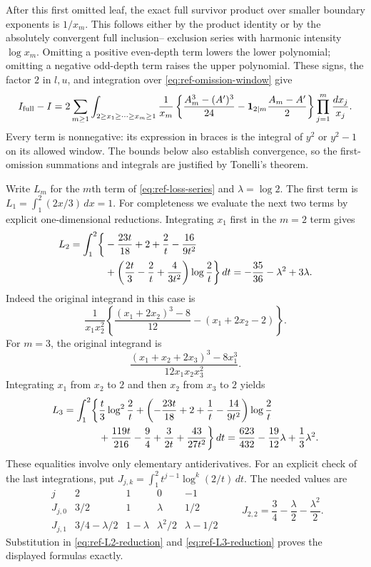 After this first omitted leaf, the exact full survivor product over
smaller boundary exponents is $1/x_m$.  This follows either by the
product identity or by the absolutely convergent full inclusion--
exclusion series with harmonic intensity $\log x_m$.  Omitting a
positive even-depth term lowers the lower polynomial; omitting a
negative odd-depth term raises the upper polynomial.  These signs,
the factor $2$ in $l,u$, and integration over
\eqref{eq:ref-omission-window} give
\begin{equation}\label{eq:ref-loss-series}
 I_{\mathrm{full}}-I
 =2\sum_{m\geq1}\int_{2\geq x_1\geq\cdots\geq x_m\geq1}
    \frac1{x_m}
     \left\{\frac{A_m^3-(A')^3}{24}
             -\mathbf 1_{2\mid m}\frac{A_m-A'}2\right\}
          \prod_{j=1}^m\frac{dx_j}{x_j}.
\end{equation}
Every term is nonnegative: its expression in braces is the integral
of $y^2$ or $y^2-1$ on its allowed window.  The bounds below also
establish convergence, so the first-omission summations and integrals
are justified by Tonelli's theorem.

Write $L_m$ for the $m$th term of \eqref{eq:ref-loss-series} and
$\lambda=\log2$.  The first term is
$L_1=\int_1^2(2x/3)\,dx=1$.  For completeness we evaluate the next
two terms by explicit one-dimensional reductions.  Integrating $x_1$
first in the $m=2$ term gives
\begin{align}\label{eq:ref-L2-reduction}
 L_2=\int_1^2\biggl\{
 &-\frac{23t}{18}+2+\frac2t-\frac{16}{9t^2}\notag\\
 &+\left(\frac{2t}3-\frac2t+\frac4{3t^2}\right)
                  \log\frac2t\biggr\}\,dt
       =-\frac{35}{36}-\lambda^2+3\lambda.
\end{align}
Indeed the original integrand in this case is
\[
 \frac1{x_1x_2^2}
 \left\{\frac{(x_1+2x_2)^3-8}{12}-(x_1+2x_2-2)\right\}.
\]
For $m=3$, the original integrand is
\[
 \frac{(x_1+x_2+2x_3)^3-8x_1^3}{12x_1x_2x_3^2}.
\]
Integrating $x_1$ from $x_2$ to $2$ and then $x_2$ from $x_3$ to $2$
yields
\begin{align}\label{eq:ref-L3-reduction}
 L_3=\int_1^2\biggl\{
 &\frac t3\log^2\frac2t
 +\left(-\frac{23t}{18}+2+\frac1t-\frac{14}{9t^2}\right)
                      \log\frac2t\notag\\
 &+\frac{119t}{216}-\frac94+\frac3{2t}+\frac{43}{27t^2}
                  \biggr\}\,dt
       =\frac{623}{432}-\frac{19}{12}\lambda+\frac13\lambda^2.
\end{align}
These equalities involve only elementary antiderivatives.  For an
explicit check of the last integrations, put
$J_{j,k}=\int_1^2 t^{j-1}\log^k(2/t)\,dt$.  The needed values are
\[
\begin{array}{c|rrrr}
 j&2&1&0&-1\\ \hline
 J_{j,0}&3/2&1&\lambda&1/2\\
 J_{j,1}&3/4-\lambda/2&1-\lambda&\lambda^2/2&\lambda-1/2
\end{array}
 \qquad J_{2,2}=\frac34-\frac\lambda2-\frac{\lambda^2}2.
\]
Substitution in \eqref{eq:ref-L2-reduction} and
\eqref{eq:ref-L3-reduction} proves the displayed formulas exactly.

